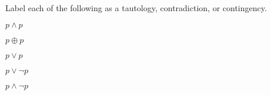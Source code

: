 
Label each of the following as a tautology, contradiction, or contingency.

$p \land p$

$p \oplus p$


$p \lor p$

$p \lor \lnot p$

$p \land \lnot p$